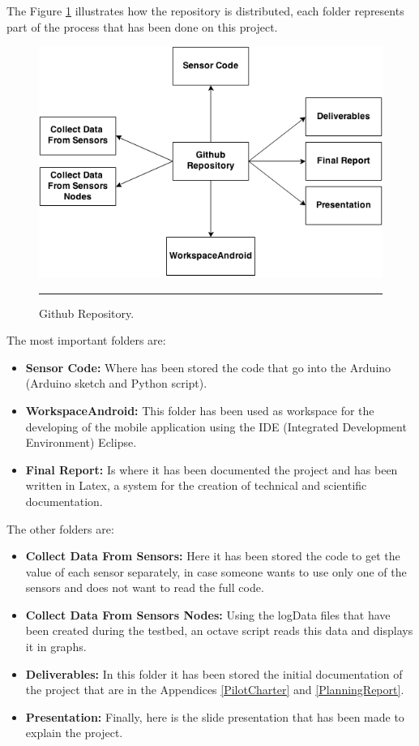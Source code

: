 \documentclass[12pt, a4paper,twoside]{tesi_upf}
\begin{document}
		The Figure \ref{fig:repository} illustrates how the repository is distributed, each folder represents part of the process that has been done on this project.
		
		\begin{figure}[htbp]
			\centering
				  \includegraphics[scale=0.6]{./Figures/repository.png}
				  \rule{25em}{0.5pt}
			\caption[Github Repository]{Github Repository.}
			\label{fig:repository}
		\end{figure} 
		
		The most important folders are:
		\begin{itemize}
			\item {\bf Sensor Code:} Where has been stored the code that go into the Arduino (Arduino sketch and Python script).
			\item {\bf WorkspaceAndroid:} This folder has been used as workspace for the developing of the mobile application using the IDE (Integrated Development Environment) Eclipse.
			\item {\bf Final Report:} Is where it has been documented the project and has been written in Latex, a system for the creation of technical and scientific documentation.
		\end{itemize}
		
		The other folders are:
		\begin{itemize}
			\item {\bf Collect Data From Sensors:} Here it has been stored the code to get the value of each sensor separately, in case someone wants to use only one of the sensors and does not want to read the full code.
			\item {\bf Collect Data From Sensors Nodes:} Using the logData files that have been created during the testbed, an octave script reads this data and displays it in graphs.
			\item {\bf Deliverables:} In this folder it has been stored the initial documentation of the project that are in the Appendices \ref{PilotCharter} and \ref{PlanningReport}.
			\item {\bf Presentation:} Finally, here is the slide presentation that has been made to explain the project.
		\end{itemize}
		
\end{document}
